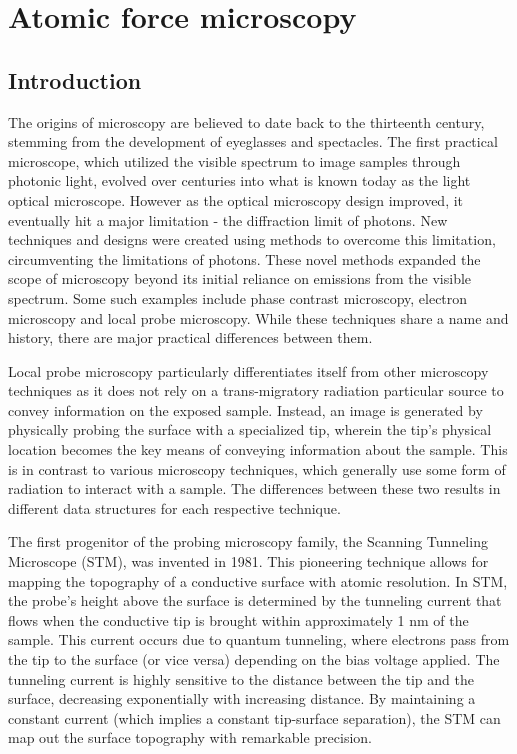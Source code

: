\chapter{Atomic force microscopy}


\section{Introduction}
The origins of microscopy are believed to date back to the thirteenth century, stemming from the development of eyeglasses and spectacles. The first practical microscope, which utilized the visible spectrum to image samples through photonic light, evolved over centuries into what is known today as the light optical microscope. However as the optical microscopy design improved, it eventually hit a major limitation - the diffraction limit of photons. New techniques and designs were created using methods to overcome this limitation, circumventing the limitations of photons. These novel methods expanded the scope of microscopy beyond its initial reliance on emissions from the visible spectrum. Some such examples include phase contrast microscopy, electron microscopy and local probe microscopy. While these techniques share a name and history, there are major practical differences between them.

Local probe microscopy particularly differentiates itself from other microscopy techniques as it does not rely on a trans-migratory radiation particular source to convey information on the exposed sample. Instead, an image is generated by physically probing the surface with a specialized tip, wherein the tip's physical location becomes the key means of conveying information about the sample. This is in contrast to various microscopy techniques, which generally use some form of radiation to interact with a sample. The differences between these two results in different data structures for each respective technique. \cite{giesbers2001surface}

The first progenitor of the probing microscopy family, the Scanning Tunneling Microscope (STM), was invented in 1981. This pioneering technique allows for mapping the topography of a conductive surface with atomic resolution. In STM, the probe's height above the surface is determined by the tunneling current that flows when the conductive tip is brought within approximately 1 nm of the sample. This current occurs due to quantum tunneling, where electrons pass from the tip to the surface (or vice versa) depending on the bias voltage applied. The tunneling current is highly sensitive to the distance between the tip and the surface, decreasing exponentially with increasing distance. By maintaining a constant current (which implies a constant tip-surface separation), the STM can map out the surface topography with remarkable precision.\cite{STMreference}

